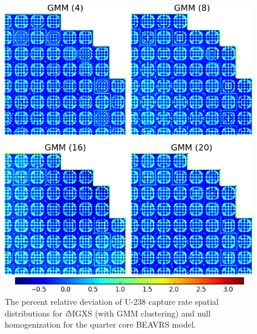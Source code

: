 \begin{figure}[h!]
\centering
\includegraphics[width=0.9\linewidth]{figures/results/compare/full-core/compare-capt-gmm}
\vspace{2mm}
\caption[U-238 capture rate \textit{i}MGXS-to-null relative deviations]{The percent relative deviation of U-238 capture rate spatial distributions for \textit{i}\ac{MGXS} (with \ac{GMM} clustering) and null homogenization for the quarter core BEAVRS model.}
\label{fig:chap11-full-core-capt-rates-gmm-comp}
\end{figure}

\clearpage

